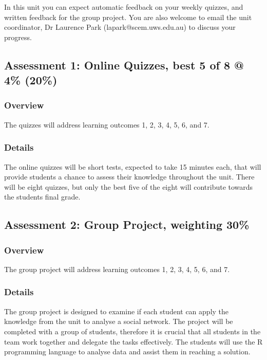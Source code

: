 \documentclass{uws_learning_guide}
\begin{document}
In this unit you can expect automatic feedback on your weekly quizzes,
and written feedback for the group project.
You are also
welcome to email the unit coordinator, Dr Laurence Park
(lapark@scem.uws.edu.au) to discuss your progress.

\subsection{Assessment 1: Online Quizzes, best 5 of 8 @ 4\% (20\%)}

\subsubsection{Overview}

The quizzes will address learning outcomes 1, 2, 3, 4, 5, 6, and 7.

\subsubsection{Details}

The online quizzes will be short tests, expected to take 15 minutes
each, that will provide students a chance to assess their knowledge
throughout the unit.  There will be eight quizzes, but only the best
five of the eight will contribute towards the students final grade.


\subsection{Assessment 2: Group Project, weighting 30\%}

\subsubsection{Overview}

The group project will address learning outcomes 1, 2, 3, 4, 5, 6, and 7.

\subsubsection{Details}

The group project is designed to examine if each student can apply the
knowledge from the unit to analyse a social network.  The project
will be completed with a group of students, therefore it is crucial
that all students in the team work together and delegate the tasks
effectively. The students will use the R programming language to analyse
data and assist them in reaching a solution.
\end{document}
